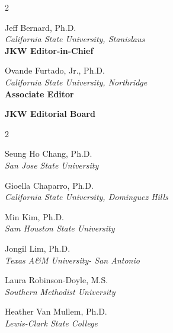 \documentclass[
  letterpaper,
  DIV=11,
  numbers=noendperiod]{scrartcl}
\begin{document}
\vspace{0.3cm}

\begin{multicols}{2}
    \begin{center}
        Jeff Bernard, Ph.D. \\
        \textit{California State University, Stanislaus} \\
        \textbf{JKW Editor-in-Chief}
    \end{center}
    
    \columnbreak
    
    \begin{center}
        Ovande Furtado, Jr., Ph.D. \\
        \textit{California State University, Northridge} \\
        \textbf{Associate Editor}
    \end{center}
\end{multicols}

\vspace{0.5cm}

\begin{center}
    \textbf{JKW Editorial Board}
\end{center}

\begin{multicols}{2}
    \begin{center}
        Seung Ho Chang, Ph.D. \\
        \textit{San Jose State University}
        
        \vspace{0.2cm}
        
        Gioella Chaparro, Ph.D. \\
        \textit{California State University, Dominguez Hills}
        
        \vspace{0.2cm}
        
        Min Kim, Ph.D. \\
        \textit{Sam Houston State University}
    \end{center}
    
    \columnbreak
    
    \begin{center}
        Jongil Lim, Ph.D. \\
        \textit{Texas A\&M University- San Antonio}
        
        \vspace{0.2cm}
        
        Laura Robinson-Doyle, M.S. \\
        \textit{Southern Methodist University}
        
        \vspace{0.2cm}
        
        Heather Van Mullem, Ph.D. \\
        \textit{Lewis-Clark State College}
    \end{center}
\end{multicols}
\end{document}
